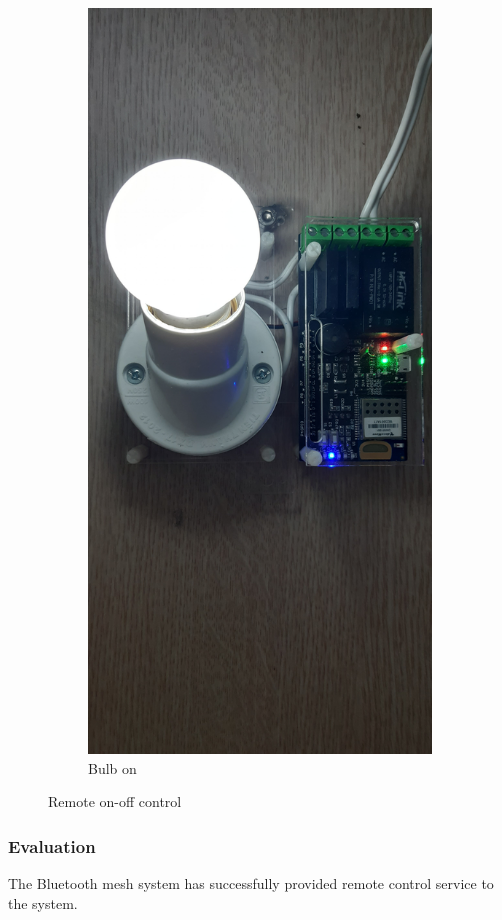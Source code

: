 \documentclass[\main/thesis.tex]{subfiles}
\begin{document}
\begin{figure}[H]
\begin{subfigure}[b]{0.4\linewidth}
    \end{subfigure}
    \begin{subfigure}[b]{0.4\linewidth}
        \centering
        \includegraphics[angle = 90, width=0.9\linewidth]{result_remote_control_on_result.jpg}
        \caption{Bulb on}
        \label{fig:result_remote_control_on_result}
    \end{subfigure}
    \caption{Remote on-off control}
    \label{fig:result_remote_control}
\end{figure}


\subsubsection{Evaluation}
The Bluetooth mesh system has successfully provided remote control service to the system.
\end{document}
